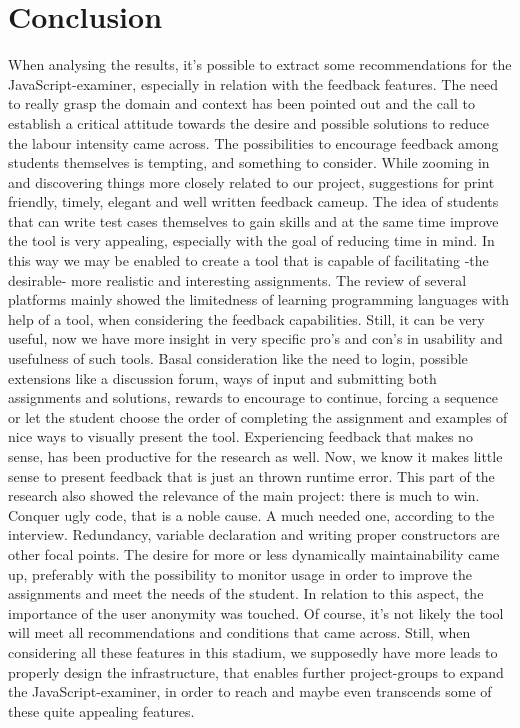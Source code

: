 \documentclass{article}
\begin{document}
\section{Conclusion} 
When analysing the results, it's possible to extract some recommendations for 
the JavaScript-examiner, especially in relation with the feedback features. The
need to really grasp the domain and context has been pointed out and the call to
establish a critical attitude towards the desire and possible solutions
to reduce the labour intensity came across. The possibilities to encourage 
feedback among students themselves is tempting, and something to consider.
\newline While zooming in and discovering things more closely related to our 
project, suggestions for print friendly, timely, elegant and well written 
feedback cameup. The idea of students that can write test cases themselves to 
gain skills and at the same time improve the tool is very appealing, especially 
with the goal of reducing time in mind. In this way we may be enabled to create 
a tool that is capable of facilitating -the desirable- more realistic and 
interesting assignments. The review of several platforms mainly showed the 
limitedness of learning programming languages with help of a tool, when 
considering the feedback capabilities. Still, it can be very useful, now we have 
more insight in very specific pro's and con's in usability and usefulness of such 
tools. Basal consideration like the need to login, possible extensions like a 
discussion forum, ways of input and submitting both assignments and solutions, 
rewards to encourage to continue, forcing a sequence or let the student choose 
the order of completing the assignment and examples of nice ways to visually 
present the tool. 
Experiencing feedback that makes no sense, has been productive for the 
research as well. Now, we know it makes little sense to present feedback that 
is just an thrown runtime error. This part of the research also showed the 
relevance of the main project: there is much to win. \newline
Conquer ugly code, that is a noble cause. A much needed one, according to the
interview. Redundancy, variable declaration and writing proper constructors are
other focal points. The desire for more or less dynamically maintainability came
up, preferably with the possibility to monitor usage in order to improve the 
assignments and meet the needs of the student. In relation to this aspect, the 
importance of the user anonymity was touched. \newline
Of course, it's not likely the tool will meet all recommendations and 
conditions that came across.
Still, when considering all these features in this stadium, we supposedly have 
more leads to properly design the infrastructure, that enables further 
project-groups to expand the JavaScript-examiner, in order to reach and maybe
even transcends some of these quite appealing features. 



\end{document}
